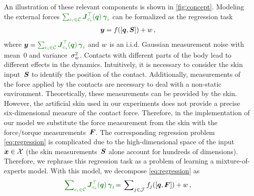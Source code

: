     An illustration of these relevant components is shown in \fig\ref{fig:concept}.
	Modeling the external forces $\color{darkgreen}{\sum_{c_i \in\mathcal{C}} {\jacobian\T_{c_i}(\q)}\, \extForces_i}$ can be formalized as the regression task
	\begin{align}
		\boldsymbol y = f([\boldsymbol q, \mathcal{\boldsymbol S}]) + w\,,
		\label{eq:regression}
	\end{align}
	where $\outputMatrix = \color{darkgreen}{\sum_{c_i \in\mathcal{C}} {\jacobian\T_{c_i}(\q)}\, \extForces_i}$ and  
	$w$ is an i.i.d. Gaussian measurement noise with mean~$0$ and variance~$\sigma_w^2$.
    Contacts with different parts of the body lead to different effects in the dynamics.
    Intuitively, it is necessary to consider the skin input~$\mathcal{\boldsymbol S}$ to identify the position of the contact.
    Additionally, measurements of the force applied by the contacts are necessary to deal with a non-static environment.
    Theoretically, these measurements can be provided by the skin.
    However, the artificial skin used in our experiments does not provide a precise six-dimensional measure of the contact force.
	Therefore, in the implementation of our model we substitute the force measurement from the skin with the force/torque measurements~$\boldsymbol {F}$.
    The corresponding regression problem \eq\eqref{eq:regression} is complicated due to the high-dimensional space of the input $\boldsymbol x \in \mathcal{X}$ (the skin measurements~$\mathcal{\boldsymbol S}$ alone account for hundreds of dimensions).
	Therefore, we rephrase this regression task as a problem of learning a mixture-of-experts model.
	With this model, we decompose \eq\eqref{eq:regression} as
	\begin{align}
		\color{darkgreen}{\sum\nolimits_{c_i \in\mathcal{C}} {\jacobian\T_{c_i}(\q)}\, \extForces_i} \color{black}{ \,=\, \sum\nolimits_{j\in\mathcal{J}} f_j([\q, \ftsForces]) + \noise\,,}
		\label{eq:expertofmixtureregression}
	\end{align}
